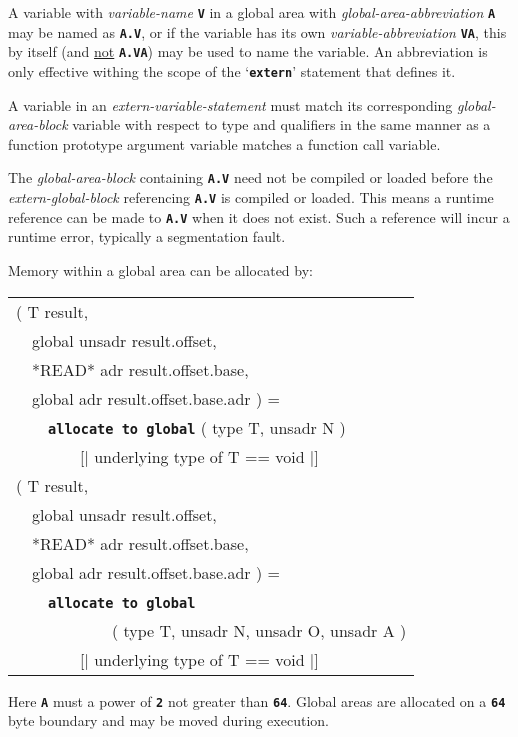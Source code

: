 \documentclass[12pt]{article}
\makeatletter
\newcommand{\TT}[1]{{\tt \bfseries #1}}
\newcommand{\ttkey}[1]{\TT{#1}\index{#1@{\tt #1}}}
\newenvironment{indpar}[1][0.3in]%
	{\begin{list}{}%
		     {\setlength{\itemsep}{0in}%
		      \setlength{\topsep}{0in}%
		      \setlength{\parsep}{1ex}%
		      \setlength{\labelwidth}{#1}%
		      \setlength{\leftmargin}{#1}%
		      \addtolength{\leftmargin}{\labelsep}}%
	 \item}%
	{\end{list}}
\makeatother
\begin{document}
A variable with {\em variable-name}
\TT{V} in a global area with {\em global-area-abbreviation}
\TT{A} may be named as \TT{A.V}, or if the variable has its own
{\em variable-abbreviation} \TT{VA},
this by itself (and \underline{not} \TT{A.VA})
may be used to name the variable.  An abbreviation is only effective
withing the scope of the `\TT{extern}' statement that defines it.

A variable in an
{\em extern-variable-statement} must match its corresponding
{\em global-area-block} variable with respect to type and qualifiers
in the same manner as a function prototype argument variable
matches a function call variable.

The {\em global-area-block} containing \TT{A.V} need not be compiled
or loaded before the {\em extern-global-block} referencing
\TT{A.V} is compiled or loaded.  This means a runtime reference
can be made to \TT{A.V} when it does not exist.  Such a reference
will incur a runtime error, typically a segmentation fault.

Memory within a global area can be allocated by:

\begin{indpar}\tt\begin{tabular}{l}
( T result, \\
~~global unsadr result.offset, \\
~~*READ* adr result.offset.base, \\
~~global adr result.offset.base.adr  ) = \\
~~~~\ttkey{allocate to global} ( type T, unsadr N ) \\
~~~~~~~~[| underlying type of T == void |]
\\[1ex]
( T result, \\
~~global unsadr result.offset, \\
~~*READ* adr result.offset.base, \\
~~global adr result.offset.base.adr  ) = \\
~~~~\ttkey{allocate to global} \\
~~~~~~~~~~~~( type T, unsadr N, unsadr O, unsadr A ) \\
~~~~~~~~[| underlying type of T == void |]
\end{tabular}\end{indpar}\label{ALLOCATE-TO-GLOBAL}

Here \TT{A} must a power of \TT{2} not greater than \TT{64}.
Global areas are allocated on a \TT{64} byte boundary and
may be moved during execution.
\end{document}
